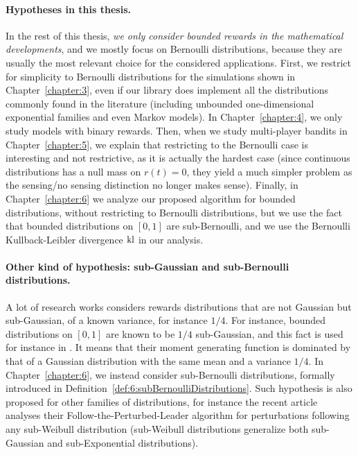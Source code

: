 \paragraph{Hypotheses in this thesis.}
%
In the rest of this thesis, \emph{we only consider bounded rewards in the mathematical developments}, and we mostly focus on Bernoulli distributions, because they are usually the most relevant choice for the considered applications.
First, we restrict for simplicity to Bernoulli distributions for the simulations shown in Chapter~\ref{chapter:3}, even if our library does implement all the distributions commonly found in the literature (including unbounded one-dimensional exponential families and even Markov models).
In Chapter~\ref{chapter:4}, we only study models with binary rewards.
%
Then, when we study multi-player bandits in Chapter~\ref{chapter:5}, we explain that restricting to the Bernoulli case is interesting and not restrictive, as it is actually the hardest case (since continuous distributions has a null mass on $r(t)=0$, they yield a much simpler problem as the sensing/no sensing distinction no longer makes sense).
%
Finally, in Chapter~\ref{chapter:6} we analyze our proposed algorithm for bounded distributions, without restricting to Bernoulli distributions, but we use the fact that bounded distributions on $[0,1]$ are sub-Bernoulli, and we use the Bernoulli Kullback-Leibler divergence $\mathrm{kl}$ in our analysis.


\paragraph{Other kind of hypothesis: sub-Gaussian and sub-Bernoulli distributions.}
%
A lot of research works considers rewards distributions that are not Gaussian but sub-Gaussian, of a known variance, for instance $1/4$.
For instance, bounded distributions on $[0,1]$ are known to be $1/4$ sub-Gaussian, and this fact is used for instance in \cite{Maillard2018GLR}.
It means that their moment generating function is dominated by that of a Gaussian distribution with the same mean and a variance $1/4$.
In Chapter~\ref{chapter:6}, we instead consider sub-Bernoulli distributions, formally introduced in Definition~\ref{def:6:subBernoulliDistributions}.
%
Such hypothesis is also proposed for other families of distributions, for instance the recent article \cite{KimTewari2019} analyses their Follow-the-Perturbed-Leader algorithm for perturbations following any sub-Weibull distribution (sub-Weibull distributions generalize both sub-Gaussian and sub-Exponential distributions).



